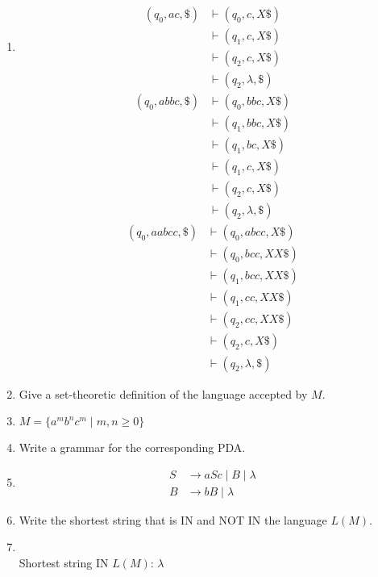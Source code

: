 \documentclass[a4paper, 12pt]{article}
\makeatletter
\renewenvironment{proof}[1][\proofname]{\par
  \normalfont \topsep6\p@\@plus6\p@\relax
  \trivlist
  \item[\hskip\labelsep
        \itshape
    #1\@addpunct{.}]\ignorespaces
}{%
  \endtrivlist\@endpefalse
}
\renewcommand{\proofname}{Solution:}
\makeatother
\begin{document}
\begin{enumerate}
\begin{center}
\begin{enumerate}
\begin{proof}
\begin{align*}
                        (q_0, ac, \$) &\vdash (q_0, c, X\$) \\
                        &\vdash (q_1, c, X\$) \\
                        &\vdash (q_2, c, X\$) \\
                        &\vdash (q_2, \lambda, \$) 
                    \end{align*}
                    \begin{align*}
                        (q_0, abbc, \$) &\vdash (q_0, bbc, X\$) \\
                        &\vdash (q_1, bbc, X\$) \\
                        &\vdash (q_1, bc, X\$) \\
                        &\vdash (q_1, c, X\$) \\
                        &\vdash (q_2, c, X\$) \\
                        &\vdash (q_2, \lambda, \$)
                    \end{align*}
                    \begin{align*}
                        (q_0, aabcc, \$) &\vdash (q_0, abcc, X\$) \\
                        &\vdash (q_0, bcc, XX\$) \\
                        &\vdash (q_1, bcc, XX\$) \\
                        &\vdash (q_1, cc, XX\$) \\
                        &\vdash (q_2, cc, XX\$) \\
                        &\vdash (q_2, c, X\$) \\
                        &\vdash (q_2, \lambda, \$)
                    \end{align*}
                \end{proof}
            \item Give a set-theoretic definition of the language accepted by $M$.
                \begin{proof}
                    \(M = \{a^mb^nc^m \mid m, n \geq 0\}\)
                \end{proof}
            \item Write a grammar for the corresponding PDA.
                \begin{proof}
                    \begin{align*}
                        S &\to aSc \mid B \mid \lambda \\
                        B &\to bB \mid \lambda
                    \end{align*}
                \end{proof}
            \item Write the shortest string that is IN and NOT IN the language $L(M)$.
                \begin{proof}
                    \leavevmode \\
                    Shortest string IN $L(M)$: $\lambda$


\end{proof}
\end{enumerate}
\end{center}
\end{enumerate}
\end{document}

